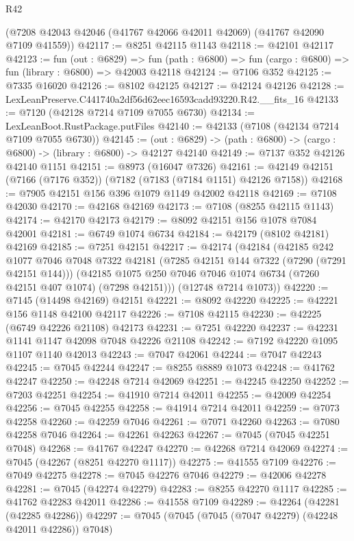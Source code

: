 \begin{lexlean}{R42}
\begin{coremodule}
{    (@7208 @42043 @42046 (@41767 @42066 @42011 @42069) (@41767 @42090 @7109 @41559))
@42117 := @8251 @42115 @1143
@42118 := @42101 @42117
@42123 := fun (out : @6829) =>
  fun (path : @6800) => fun (cargo : @6800) => fun (library : @6800) => @42003 @42118
@42124 := @7106 @352
@42125 := @7335 @16020
@42126 := @8102 @42125
@42127 := @42124 @42126
@42128 := LexLeanPreserve.C441740a2df56d62eec16593cadd93220.R42.__fits_16
@42133 := @7120 (@42128 @7214 @7109 @7055 @6730)
@42134 := LexLeanBoot.RustPackage.putFiles
@42140 := @42133 (@7108 (@42134 @7214 @7109 @7055 @6730))
@42145 := (out : @6829) -> (path : @6800) -> (cargo : @6800) -> (library : @6800) -> @42127 @42140
@42149 := @7137 @352 @42126 @42140 @1151
@42151 := @8973 (@16047 @7326)
@42161 := @42149 @42151 (@7166 (@7176 @352)) (@7182 (@7183 (@7184 @1151) @42126 @7158))
@42168 := @7905 @42151 @156 @396 @1079 @1149 @42002 @42118
@42169 := @7108 @42030
@42170 := @42168 @42169
@42173 := @7108 (@8255 @42115 @1143)
@42174 := @42170 @42173
@42179 := @8092 @42151 @156 @1078 @7084 @42001
@42181 := @6749 @1074 @6734
@42184 := @42179 (@8102 @42181) @42169
@42185 := @7251 @42151
@42217 := @42174
    (@42184
      (@42185
        @242
        @1077
        @7046
        @7048
        @7322
        @42181
        (@7285 @42151 @144 @7322 (@7290 (@7291 @42151 @144)))
        (@42185 @1075 @250 @7046 @7046 @1074 @6734 (@7260 @42151 @407 @1074) (@7298 @42151)))
      (@12748 @7214 @1073))
@42220 := @7145 (@14498 @42169) @42151
@42221 := @8092 @42220
@42225 := @42221 @156 @1148 @42100 @42117
@42226 := @7108 @42115
@42230 := @42225 (@6749 @42226 @21108) @42173
@42231 := @7251 @42220
@42237 := @42231 @1141 @1147 @42098 @7048 @42226 @21108
@42242 := @7192 @42220 @1095 @1107 @1140 @42013
@42243 := @7047 @42061
@42244 := @7047 @42243
@42245 := @7045 @42244
@42247 := @8255 @8889 @1073
@42248 := @41762 @42247
@42250 := @42248 @7214 @42069
@42251 := @42245 @42250
@42252 := @7203 @42251
@42254 := @41910 @7214 @42011
@42255 := @42009 @42254
@42256 := @7045 @42255
@42258 := @41914 @7214 @42011
@42259 := @7073 @42258
@42260 := @42259 @7046
@42261 := @7071 @42260
@42263 := @7080 @42258 @7046
@42264 := @42261 @42263
@42267 := @7045 (@7045 @42251 @7048)
@42268 := @41767 @42247
@42270 := @42268 @7214 @42069
@42274 := @7045 (@42267 (@8251 @42270 @1117))
@42275 := @41555 @7109
@42276 := @7049 @42275
@42278 := @7045 @42276 @7046
@42279 := @42006 @42278
@42281 := @7045 (@42274 @42279)
@42283 := @8255 @42270 @1117
@42285 := @41762 @42283 @42011
@42286 := @41558 @7109
@42289 := @42264 (@42281 (@42285 @42286))
@42297 := @7045 (@7045 (@7045 (@7047 @42279) (@42248 @42011 @42286)) @7048)
}
\end{coremodule}
\end{lexlean}
